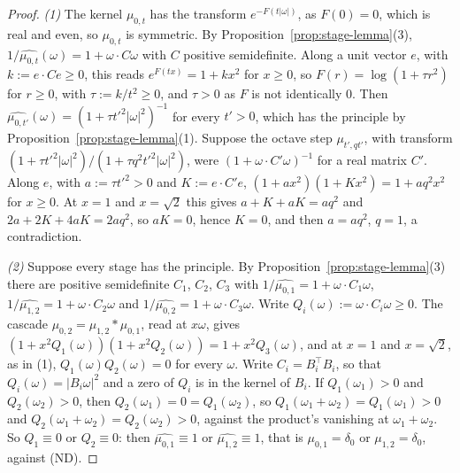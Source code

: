 \begin{proof}
\leanok
{}
\emph{(1)} The kernel $\mu_{0,t}$ has the transform $e^{-F(t|\omega|)}$, as $F(0) = 0$, which is
real and even, so $\mu_{0,t}$ is symmetric. By Proposition~\ref{prop:stage-lemma}(3),
$1/\widehat{\mu_{0,t}}(\omega) = 1 + \omega\cdot C\omega$ with $C$ positive semidefinite. Along a
unit vector $e$, with $k := e\cdot Ce \ge 0$, this reads $e^{F(tx)} = 1 + kx^2$ for $x \ge 0$, so
$F(r) = \log(1 + \tau r^2)$ for $r \ge 0$, with $\tau := k/t^2 \ge 0$, and $\tau > 0$ as $F$ is not
identically $0$. Then $\widehat{\mu_{0,t'}}(\omega) = (1 + \tau t'^2|\omega|^2)^{-1}$ for every
$t' > 0$, which has the principle by Proposition~\ref{prop:stage-lemma}(1). Suppose the octave
step $\mu_{t',qt'}$, with transform $(1 + \tau t'^2|\omega|^2)/(1 + \tau q^2t'^2|\omega|^2)$, were
$(1 + \omega\cdot C'\omega)^{-1}$ for a real matrix $C'$. Along $e$, with $a := \tau t'^2 > 0$ and
$K := e\cdot C'e$, $(1 + ax^2)(1 + Kx^2) = 1 + aq^2x^2$ for $x \ge 0$. At $x = 1$ and $x = \sqrt2$
this gives $a + K + aK = aq^2$ and $2a + 2K + 4aK = 2aq^2$, so $aK = 0$, hence $K = 0$, and then
$a = aq^2$, $q = 1$, a contradiction.

\emph{(2)} Suppose every stage has the principle. By Proposition~\ref{prop:stage-lemma}(3) there
are positive semidefinite $C_1$, $C_2$, $C_3$ with
$1/\widehat{\mu_{0,1}} = 1 + \omega\cdot C_1\omega$, $1/\widehat{\mu_{1,2}} = 1 + \omega\cdot
C_2\omega$ and $1/\widehat{\mu_{0,2}} = 1 + \omega\cdot C_3\omega$. Write
$Q_i(\omega) := \omega\cdot C_i\omega \ge 0$. The cascade $\mu_{0,2} = \mu_{1,2} * \mu_{0,1}$,
read at $x\omega$, gives $(1 + x^2Q_1(\omega))(1 + x^2Q_2(\omega)) = 1 + x^2Q_3(\omega)$, and at
$x = 1$ and $x = \sqrt2$, as in (1), $Q_1(\omega)Q_2(\omega) = 0$ for every $\omega$. Write
$C_i = B_i^\top B_i$, so that $Q_i(\omega) = |B_i\omega|^2$ and a zero of $Q_i$ is in the kernel of
$B_i$. If $Q_1(\omega_1) > 0$ and $Q_2(\omega_2) > 0$, then $Q_2(\omega_1) = 0 = Q_1(\omega_2)$, so
$Q_1(\omega_1 + \omega_2) = Q_1(\omega_1) > 0$ and $Q_2(\omega_1 + \omega_2) = Q_2(\omega_2) > 0$,
against the product's vanishing at $\omega_1 + \omega_2$. So $Q_1 \equiv 0$ or $Q_2 \equiv 0$: then
$\widehat{\mu_{0,1}} \equiv 1$ or $\widehat{\mu_{1,2}} \equiv 1$, that is $\mu_{0,1} = \delta_0$ or
$\mu_{1,2} = \delta_0$, against (ND).
\end{proof}

